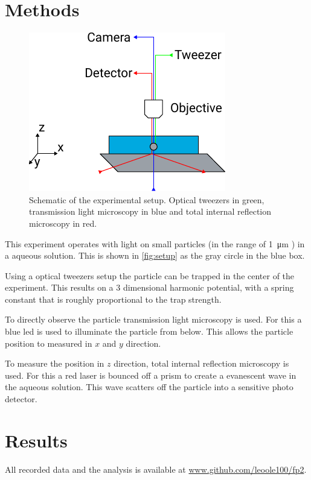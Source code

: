 \documentclass[
    parskip=half, 
    twoside=false,
    twocolumn=true,
    fontsize=11pt,
]{scrarticle}
\begin{document}
\section{Methods}
\begin{figure}
    \centering
    \includegraphics{figures/setup.pdf}
    \caption{Schematic of the experimental setup. Optical tweezers in green, transmission light microscopy in blue and total internal reflection microscopy in red.}
    \label{fig:setup}
\end{figure}
This experiment operates with light on small particles (in the range of \SI{1}{\micro m} \cite{instructions}) in a aqueous solution.
This is shown in \autoref{fig:setup} as the gray circle in the blue box.

Using a optical tweezers setup the particle can be trapped in the center of the experiment.
This results on a 3 dimensional harmonic potential, with a spring constant that is roughly proportional to the trap strength.

To directly observe the particle transmission light microscopy is used.
For this a blue led is used to illuminate the particle from below.
This allows the particle position to measured in $x$ and $y$ direction.

To measure the position in $z$ direction, total internal reflection microscopy is used.
For this a red laser is bounced off a prism to create a evanescent wave in the aqueous solution.
This wave scatters off the particle into a sensitive photo detector.


\section{Results}
All recorded data and the analysis is available at \url{www.github.com/leoole100/fp2}.
\end{document}

